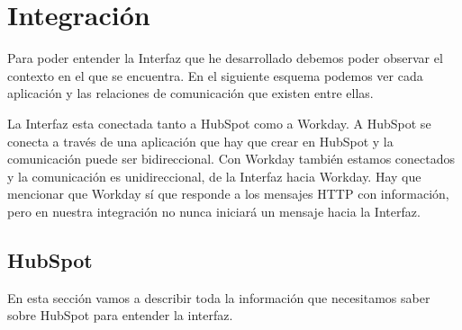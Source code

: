 









\chapter{Integración}

Para poder entender la Interfaz que he desarrollado debemos poder observar el contexto en el que se encuentra. En el siguiente esquema podemos ver cada aplicación y las relaciones de comunicación que existen entre ellas.

La Interfaz esta conectada tanto a HubSpot como a Workday. A HubSpot se conecta a través de una aplicación que hay que crear en HubSpot y la comunicación  puede ser bidireccional.
Con Workday también estamos conectados y la comunicación es unidireccional, de la Interfaz hacia Workday. Hay que mencionar que Workday sí que responde a los mensajes HTTP con información, pero en nuestra integración no  nunca iniciará un mensaje hacia la Interfaz.

\section{HubSpot}
En esta sección vamos a describir toda la información que necesitamos saber sobre HubSpot para entender la interfaz.

